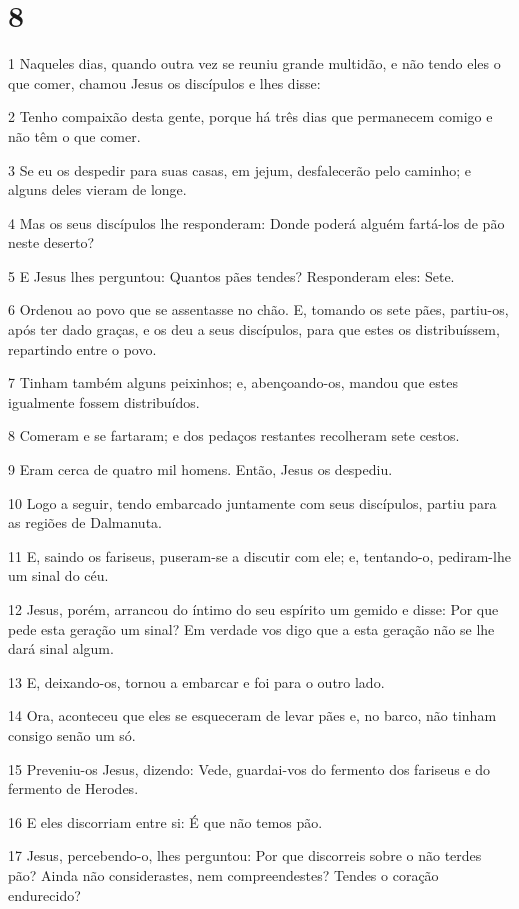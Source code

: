 \chapter{8}

\par 1 Naqueles dias, quando outra vez se reuniu grande multidão, e não tendo eles o que comer, chamou Jesus os discípulos e lhes disse:
\par 2 Tenho compaixão desta gente, porque há três dias que permanecem comigo e não têm o que comer.
\par 3 Se eu os despedir para suas casas, em jejum, desfalecerão pelo caminho; e alguns deles vieram de longe.
\par 4 Mas os seus discípulos lhe responderam: Donde poderá alguém fartá-los de pão neste deserto?
\par 5 E Jesus lhes perguntou: Quantos pães tendes? Responderam eles: Sete.
\par 6 Ordenou ao povo que se assentasse no chão. E, tomando os sete pães, partiu-os, após ter dado graças, e os deu a seus discípulos, para que estes os distribuíssem, repartindo entre o povo.
\par 7 Tinham também alguns peixinhos; e, abençoando-os, mandou que estes igualmente fossem distribuídos.
\par 8 Comeram e se fartaram; e dos pedaços restantes recolheram sete cestos.
\par 9 Eram cerca de quatro mil homens. Então, Jesus os despediu.
\par 10 Logo a seguir, tendo embarcado juntamente com seus discípulos, partiu para as regiões de Dalmanuta.
\par 11 E, saindo os fariseus, puseram-se a discutir com ele; e, tentando-o, pediram-lhe um sinal do céu.
\par 12 Jesus, porém, arrancou do íntimo do seu espírito um gemido e disse: Por que pede esta geração um sinal? Em verdade vos digo que a esta geração não se lhe dará sinal algum.
\par 13 E, deixando-os, tornou a embarcar e foi para o outro lado.
\par 14 Ora, aconteceu que eles se esqueceram de levar pães e, no barco, não tinham consigo senão um só.
\par 15 Preveniu-os Jesus, dizendo: Vede, guardai-vos do fermento dos fariseus e do fermento de Herodes.
\par 16 E eles discorriam entre si: É que não temos pão.
\par 17 Jesus, percebendo-o, lhes perguntou: Por que discorreis sobre o não terdes pão? Ainda não considerastes, nem compreendestes? Tendes o coração endurecido?
